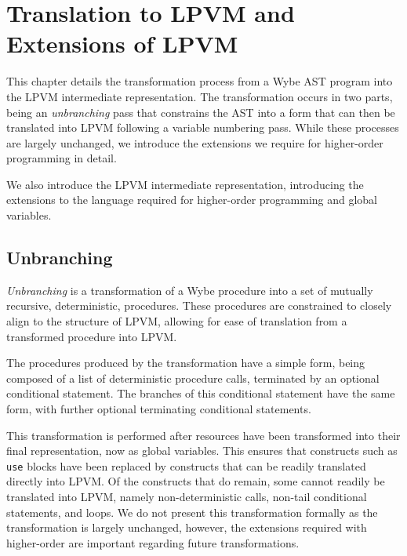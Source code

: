 \clearpage

\def\chaptertitle{Translation to LPVM and Extensions of LPVM}

\lhead{\emph{\chaptertitle}}

\chapter{\chaptertitle}
\label{ch:lpvm-conversion}

This chapter details the transformation process from a Wybe AST program into the LPVM intermediate representation. The transformation occurs in two parts, being an \textit{unbranching} pass that constrains the AST into a form that can then be translated into LPVM following a variable numbering pass. While these processes are largely unchanged, we introduce the extensions we require for higher-order programming in detail. 

We also introduce the LPVM intermediate representation, introducing the extensions to the language required for higher-order programming and global variables. 

\section{Unbranching}
\label{sec:unbranching}

\textit{Unbranching} is a transformation of a Wybe procedure into a set of mutually recursive, deterministic, procedures. These procedures are constrained to closely align to the structure of LPVM, allowing for ease of translation from a transformed procedure into LPVM. 

The procedures produced by the transformation have a simple form, being composed of a list of deterministic procedure calls, terminated by an optional conditional statement. The branches of this conditional statement have the same form, with further optional terminating conditional statements.

This transformation is performed after resources have been transformed into their final representation, now as global variables. This ensures that constructs such as \texttt{use} blocks have been replaced by constructs that can be readily translated directly into LPVM. Of the constructs that do remain, some cannot readily be translated into LPVM, namely non-deterministic calls, non-tail conditional statements, and loops. We do not present this transformation formally as the transformation is largely unchanged, however, the extensions required with higher-order are important regarding future transformations.

